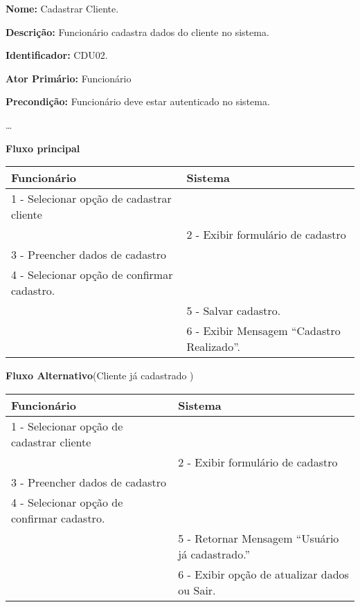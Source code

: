 	\par
	\textbf{Nome:} Cadastrar Cliente.
	\par
	\textbf{Descrição:} Funcionário cadastra dados do cliente no sistema.
	\par 
	\textbf{Identificador:} CDU02.
	\par
	\textbf{Ator Primário:} Funcionário	
	\par
	\textbf{Precondição:} Funcionário deve estar autenticado no sistema.
	\par
	\ldots
	\par
	\textbf{Fluxo principal}\par
	\begin{tabular}{|p{7cm}|p{7cm}|}
		\hline 
		Funcionário & Sistema \\ 
		\hline 	
		1 - Selecionar opção de cadastrar cliente &  \\ 
		\hline 
		& 
		
		2 - Exibir formulário de cadastro 
		\\ 
		\hline 
		3 - Preencher dados de cadastro
		& 		

		\\ 
		\hline 
		4 - Selecionar opção de confirmar cadastro.
		& 
		
		\\ 
		\hline 
		& 	
		
		5 - Salvar cadastro. 	
		\\ 
		\hline 
		& 
		
		6 - Exibir Mensagem “Cadastro Realizado”.
		\\ 		
		\hline 
	\end{tabular} 
	\vspace{12px}
	\par
	\textbf{Fluxo Alternativo}(Cliente já cadastrado )\par
	\begin{tabular}{|p{7cm}|p{7cm}|}
		\hline 
		Funcionário & Sistema \\ 
		\hline 	
		1 - Selecionar opção de cadastrar cliente &  \\ 
		\hline 
		& 
		
		2 - Exibir formulário de cadastro 
		\\ 
		\hline 
		3 - Preencher dados de cadastro
		& 		
		
		\\ 
		\hline 
		4 - Selecionar opção de confirmar cadastro.
		& 
		
		\\ 
		\hline 
		& 	
		
		5 - Retornar Mensagem “Usuário já cadastrado.”	
		\\ 
		\hline 
		& 
		
		6 - Exibir opção de atualizar dados  ou Sair.
		\\ 		
		\hline 
	\end{tabular}
	\vspace{12px}

